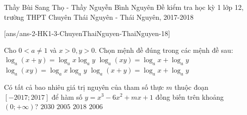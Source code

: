 \begin{name}
{Thầy Bùi Sang Thọ - Thầy Nguyễn Bình Nguyên}
{Đề kiểm tra học kỳ 1 lớp 12, trường THPT Chuyên Thái Nguyên - Thái Nguyên, 2017-2018}
\end{name}
\setcounter{ex}{0}
[ans/ans-2-HK1-3-ChuyenThaiNguyen-ThaiNguyen-18]
\begin{ex}%
	Cho $0<a\neq 1$ và $x>0, y>0$. Chọn mệnh đề đúng trong các mệnh đề sau:
	\choice
	{$\log_a(x+y)=\log_ax\log_ay$}
	{\True $\log_a(xy)=\log_ax+\log_ay$}
	{$\log_a(xy)=\log_ax\log_ay$}
	{$\log_a(x+y)=\log_ax+\log_ay$}
\end{ex}

\begin{ex}%
	Có tất cả bao nhiêu giá trị nguyên của tham số thực $m$ thuộc đoạn $\left[-2017; 2017\right]$ để hàm số $y=x^3-6x^2+mx+1$ đồng biến trên khoảng $\left(0; +\infty\right)$?
	\choice
	{$2030$}
	{$2005$}
	{$2018$}
	{\True $2006$}
\end{ex} 

